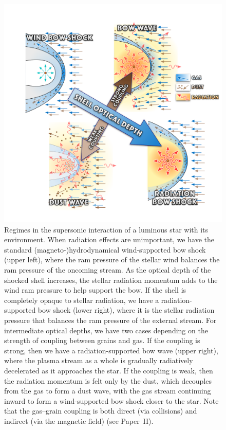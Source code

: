 \begin{figure}
  \centering
  \includegraphics[width=0.8\linewidth]{figs/bows-and-waves}
  \caption{Regimes in the supersonic interaction of a luminous star
    with its environment.  When radiation effects are unimportant, we
    have the standard (magneto-)hydrodynamical wind-supported bow
    shock (upper left), where the ram pressure of the stellar wind
    balances the ram pressure of the oncoming stream.  As the optical
    depth of the shocked shell increases, the stellar radiation
    momentum adds to the wind ram pressure to help support the bow.
    If the shell is completely opaque to stellar radiation, we have a
    radiation-supported bow shock (lower right), where it is the
    stellar radiation pressure that balances the ram pressure of the
    external stream.  For intermediate optical depths, we have two
    cases depending on the strength of coupling between grains and
    gas.  If the coupling is strong, then we have a
    radiation-supported bow wave (upper right), where the plasma
    stream as a whole is gradually radiatively decelerated as it
    approaches the star.  If the coupling is weak, then the radiation
    momentum is felt only by the dust, which decouples from the gas to
    form a dust wave, with the gas stream continuing inward to form a
    wind-supported bow shock closer to the star.  Note that the
    gas--grain coupling is both direct (via collisions) and indirect
    (via the magnetic field) (see Paper~II).}
  \label{fig:3-types-bow}
\end{figure}

